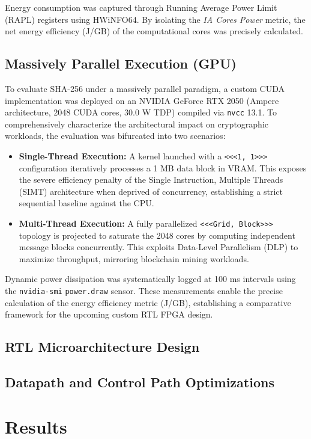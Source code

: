 \documentclass[conference]{IEEEtran}
\begin{document}
Energy consumption was captured through Running Average Power Limit (RAPL) registers using HWiNFO64. By isolating the \textit{IA Cores Power} metric, the net energy efficiency (J/GB) of the computational cores was precisely calculated.
\subsection{Massively Parallel Execution (GPU)}

To evaluate SHA-256 under a massively parallel paradigm, a custom CUDA implementation was deployed on an NVIDIA GeForce RTX 2050 (Ampere architecture, 2048 CUDA cores, 30.0 W TDP) compiled via \texttt{nvcc} 13.1. To comprehensively characterize the architectural impact on cryptographic workloads, the evaluation was bifurcated into two scenarios:

\begin{itemize}
    \item \textbf{Single-Thread Execution:} A kernel launched with a \texttt{<<<1, 1>>>} configuration iteratively processes a 1 MB data block in VRAM. This exposes the severe efficiency penalty of the Single Instruction, Multiple Threads (SIMT) architecture when deprived of concurrency, establishing a strict sequential baseline against the CPU.
    \item \textbf{Multi-Thread Execution:} A fully parallelized \texttt{<<<Grid, Block>>>} topology is projected to saturate the 2048 cores by computing independent message blocks concurrently. This exploits Data-Level Parallelism (DLP) to maximize throughput, mirroring blockchain mining workloads.
\end{itemize}

Dynamic power dissipation was systematically logged at 100 ms intervals using the \texttt{nvidia-smi} \texttt{power.draw} sensor. These measurements enable the precise calculation of the energy efficiency metric (J/GB), establishing a comparative framework for the upcoming custom RTL FPGA design.
\subsection{RTL Microarchitecture Design}
\subsection{Datapath and Control Path Optimizations}
\section{Results}
\end{document}

